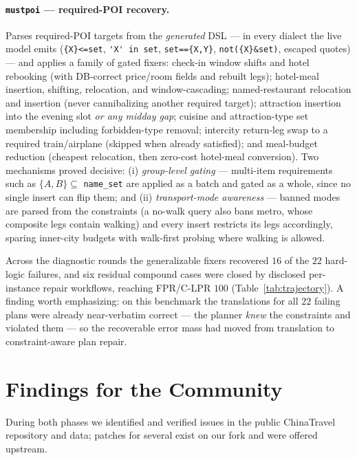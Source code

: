 \documentclass{article}
\begin{document}
\paragraph{\texttt{mustpoi} --- required-POI recovery.}
Parses required-POI targets from the \emph{generated} DSL --- in every
dialect the live model emits (\lstinline|{X}<=set|, \lstinline|'X' in set|,
\lstinline|set=={X,Y}|, \lstinline|not({X}&set)|, escaped quotes) --- and
applies a family of gated fixers: check-in window shifts and hotel
rebooking (with DB-correct price/room fields and rebuilt legs); hotel-meal
insertion, shifting, relocation, and window-cascading; named-restaurant
relocation and insertion (never cannibalizing another required target);
attraction insertion into the evening slot \emph{or any midday gap};
cuisine and attraction-type set membership including forbidden-type
removal; intercity return-leg swap to a required train/airplane (skipped
when already satisfied); and meal-budget reduction (cheapest relocation,
then zero-cost hotel-meal conversion). Two mechanisms proved decisive:
(i) \emph{group-level gating} --- multi-item requirements such as
$\{A,B\}\subseteq$ \texttt{name\_set} are applied as a batch and gated as a
whole, since no single insert can flip them; and (ii)
\emph{transport-mode awareness} --- banned modes are parsed from the
constraints (a no-walk query also bans metro, whose composite legs contain
walking) and every insert restricts its legs accordingly, sparing
inner-city budgets with walk-first probing where walking is allowed.

Across the diagnostic rounds the generalizable fixers recovered $16$ of the
$22$ hard-logic failures, and six residual compound cases were closed by
disclosed per-instance repair workflows, reaching FPR/C-LPR $100$
(Table~\ref{tab:trajectory}). A finding worth emphasizing: on this
benchmark the translations for all $22$ failing plans were already
near-verbatim correct --- the planner \emph{knew} the constraints and
violated them --- so the recoverable error mass had moved from translation
to constraint-aware plan repair.

\section{Findings for the Community}
\label{sec:findings}

During both phases we identified and verified issues in the public
ChinaTravel repository and data; patches for several exist on our fork and
were offered upstream.
\end{document}
